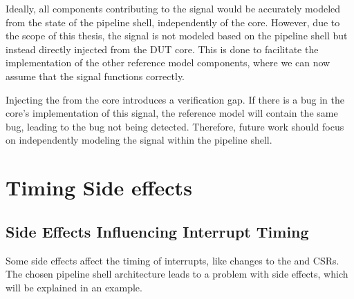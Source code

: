 Ideally, all components contributing to the  signal would be accurately modeled from the state of the pipeline shell, independently of the core. However, due to the scope of this thesis, the  signal is not modeled based on the pipeline shell but instead directly injected from the DUT core. This is done to facilitate the implementation of the other reference model components, where we can now assume that the  signal functions correctly.

Injecting the  from the core introduces a verification gap. If there is a bug in the core's implementation of this signal, the reference model will contain the same bug, leading to the bug not being detected. Therefore, future work should focus on independently modeling the  signal within the pipeline shell.

%





\section{Timing Side effects}%
\label{sec:ps_side-effects}

\subsection{Side Effects Influencing Interrupt Timing}

Some side effects affect the timing of interrupts, like changes to the  and  CSRs. The chosen pipeline shell architecture leads to a problem with side effects, which will be explained in an example.

